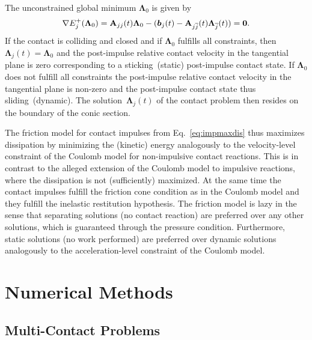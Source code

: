 \documentclass[global,twocolumn]{svjour}
\let\vec\bm
\newcommand{\mat}[1]{{\bf #1}}
\newcommand{\contactimpulse}[1]{\ensuremath{\vec{\Lambda}_{#1}}}
\begin{document}
		The unconstrained global minimum $\vec \Lambda_0$ is given by
		\begin{equation*}
			\nabla E_j^+ (\vec \Lambda_0) = \mat{A}_{jj}(t) \vec \Lambda_0 - (\vec b_j(t) - \mat{A}_{j\overline{j}}(t) \contactimpulse{\overline{j}}(t))= \vec 0.
		\end{equation*}
		If the contact is colliding and closed and if $\vec \Lambda_0$ fulfills
		all constraints, then $\contactimpulse{j}(t) = \vec \Lambda_0$ and the
		post-impulse relative contact velocity in the tangential plane is zero
		corresponding to a sticking~(static) post-impulse contact state.
		If $\vec \Lambda_0$ does not fulfill all constraints the post-impulse
		relative contact velocity in the tangential plane is non-zero and the
		post-impulse contact state thus sliding~(dynamic). The
		solution~$\contactimpulse{j}(t)$ of the contact problem then resides on
		the boundary of the conic section.

		The friction model for contact impulses from Eq.~\eqref{eq:impmaxdis}
		thus maximizes dissipation by minimizing the (kinetic) energy
		analogously to the velocity-level constraint of the Coulomb model for
		non-impulsive contact reactions. This is in contrast to the alleged
		extension of the Coulomb model to impulsive reactions, where the
		dissipation is not (sufficiently) maximized. At the same time the
		contact impulses fulfill the friction cone condition as in the Coulomb
		model and they fulfill the inelastic restitution hypothesis. The friction model
		is lazy in the sense that separating solutions (no contact reaction)
		are preferred over any other solutions, which is guaranteed through the
		pressure condition. Furthermore, static solutions (no work performed)
		are preferred over dynamic solutions analogously to the
		acceleration-level constraint of the Coulomb model.





		\section{Numerical Methods}
		\label{sec:numerics}

		\subsection{Multi-Contact Problems}
\end{document}
